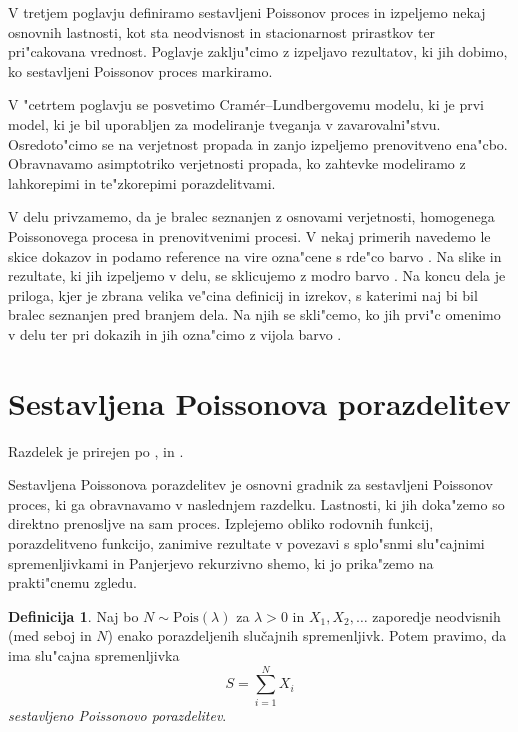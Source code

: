\documentclass[12pt, a4paper, reqno]{amsart}
\theoremstyle{definition}
\newtheorem{definicija}{Definicija}[section]
\theoremstyle{plain}
\newcommand{\1}{\mathds{1}}
\newcommand{\Pois}[1]{\text{Pois}(#1)}
\begin{document}
    V tretjem poglavju definiramo sestavljeni Poissonov proces in izpeljemo nekaj osnovnih lastnosti, kot sta 
    neodvisnost in stacionarnost prirastkov ter pri"cakovana vrednost. Poglavje zaklju"cimo z izpeljavo rezultatov,
    ki jih dobimo, ko sestavljeni Poissonov proces markiramo.

    V "cetrtem poglavju se posvetimo Cramér--Lundbergovemu modelu, ki je prvi model, ki je bil uporabljen za
    modeliranje tveganja v zavarovalni"stvu. Osredoto"cimo se na verjetnost propada in zanjo izpeljemo prenovitveno
    ena"cbo. Obravnavamo asimptotriko verjetnosti propada, ko zahtevke modeliramo z lahkorepimi in te"zkorepimi
    porazdelitvami.

    V delu privzamemo, da je bralec seznanjen z osnovami verjetnosti, homogenega Poissonovega procesa in prenovitvenimi procesi.
    V nekaj primerih navedemo le skice dokazov in podamo reference na vire ozna"cene s rde"co barvo . 
    Na slike in rezultate, ki jih izpeljemo v delu, se sklicujemo z modro barvo .
    Na koncu dela je priloga, kjer je zbrana velika ve"cina definicij in izrekov, s katerimi naj bi bil bralec seznanjen pred branjem dela. Na njih 
    se skli"cemo, ko jih prvi"c omenimo v delu ter pri dokazih in jih ozna"cimo z vijola barvo .

    \newpage
\section{Sestavljena Poissonova porazdelitev}

    \noindent
    Razdelek je prirejen po \cite{1}, \cite{2} in  \cite{4}.

    Sestavljena Poissonova porazdelitev je osnovni gradnik za sestavljeni Poissonov proces, ki ga obravnavamo 
    v naslednjem razdelku. Lastnosti, ki jih doka"zemo so direktno prenosljve na sam proces. Izplejemo 
    obliko rodovnih funkcij, porazdelitveno funkcijo, zanimive rezultate v povezavi s 
    splo"snmi slu"cajnimi spremenljivkami in Panjerjevo rekurzivno shemo, ki jo prika"zemo na 
    prakti"cnemu zgledu.

    \begin{definicija}
        Naj bo $N\sim \Pois{\lambda}$  za $\lambda >0$ in $X_1, X_2, \dots$ zaporedje neodvisnih (med seboj in $N$)
        enako porazdeljenih slučajnih spremenljivk. Potem pravimo, da ima slu"cajna spremenljivka
        \begin{equation*}
            S = \sum_{i=1}^NX_i
        \end{equation*}
        \textit{sestavljeno Poissonovo porazdelitev}. 
        \label{def:sestavljenaPoissonovaPorazdelitev}
    \end{definicija}
\end{document}
